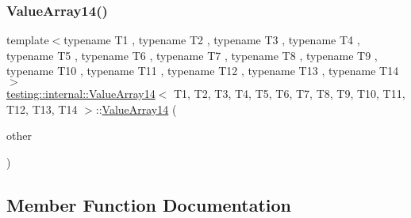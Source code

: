 \subsubsection{\texorpdfstring{ValueArray14()}{ValueArray14()}\hspace{0.1cm}{\footnotesize\ttfamily [2/2]}}
{\footnotesize\ttfamily template$<$typename T1 , typename T2 , typename T3 , typename T4 , typename T5 , typename T6 , typename T7 , typename T8 , typename T9 , typename T10 , typename T11 , typename T12 , typename T13 , typename T14 $>$ \\
\mbox{\hyperlink{classtesting_1_1internal_1_1ValueArray14}{testing\+::internal\+::\+Value\+Array14}}$<$ T1, T2, T3, T4, T5, T6, T7, T8, T9, T10, T11, T12, T13, T14 $>$\+::\mbox{\hyperlink{classtesting_1_1internal_1_1ValueArray14}{Value\+Array14}} (\begin{DoxyParamCaption}\item[{const \mbox{\hyperlink{classtesting_1_1internal_1_1ValueArray14}{Value\+Array14}}$<$ T1, T2, T3, T4, T5, T6, T7, T8, T9, T10, T11, T12, T13, T14 $>$ \&}]{other }\end{DoxyParamCaption})\hspace{0.3cm}{\ttfamily [inline]}}



\subsection{Member Function Documentation}
\mbox{\label{classtesting_1_1internal_1_1ValueArray14_aef77c9d7520c7313e2af66fd79185698}} 
